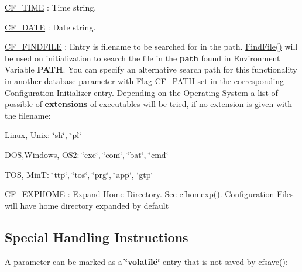 \begin{DoxyItemize}
\item \hyperlink{group__special__options__mask_ga0fde537a92deb77f75b21c9e8d306509}{C\-F\-\_\-\-T\-I\-M\-E} \-: Time string. 
\begin{DoxyItemize}
\item \hyperlink{group__special__options__mask_ga1c5b511a34d2c0db6631539ba81a4386}{C\-F\-\_\-\-D\-A\-T\-E} \-: Date string. 
\end{DoxyItemize}
\end{DoxyItemize}


\begin{DoxyItemize}
\item \hyperlink{group__special__options__mask_ga675b6f8440beecc09fec54d17e9c3ee9}{C\-F\-\_\-\-F\-I\-N\-D\-F\-I\-L\-E} \-: Entry is filename to be searched for in the path.  \hyperlink{group__utilities_ga59fc2b29cf26051e0854b664f5aed15d}{Find\-File()} will be used on initialization to search the file in the {\bfseries path} found in Environment Variable {\bfseries P\-A\-T\-H}. You can specify an alternative search path for this functionality in another database parameter with Flag \hyperlink{group__special__options__mask_gab383c1436888ea6b410141f7c0b1f306}{C\-F\-\_\-\-P\-A\-T\-H} set in the corresponding \hyperlink{config_initializer}{Configuration Initializer} entry. Depending on the Operating System a list of possible of {\bfseries extensions} of executables will be tried, if no extension is given with the filename\-:
\begin{DoxyItemize}
\item Linux, Unix\-: \char`\"{}sh\char`\"{}, \char`\"{}pl\char`\"{}
\item D\-O\-S,Windows, O\-S2\-: \char`\"{}exe\char`\"{}, \char`\"{}com\char`\"{}, \char`\"{}bat\char`\"{}, \char`\"{}cmd\char`\"{}
\item T\-O\-S, Min\-T\-: \char`\"{}ttp\char`\"{}, \char`\"{}tos\char`\"{}, \char`\"{}prg\char`\"{}, \char`\"{}app\char`\"{}, \char`\"{}gtp\char`\"{}
\end{DoxyItemize}
\end{DoxyItemize}


\begin{DoxyItemize}
\item \hyperlink{group__special__options__mask_gaff1b2e25aa9a89a55c1784018e24aa75}{C\-F\-\_\-\-E\-X\-P\-H\-O\-M\-E} \-: Expand Home Directory.  See \hyperlink{group__advanced__features_ga469258ed449ac26d5c82e665db491ff2}{cfhomexp()}. \hyperlink{config_files}{Configuration Files} will have home directory expanded by default
\end{DoxyItemize}\hypertarget{parameter_types_handling_instructions}{}\subsection{Special Handling Instructions}\label{parameter_types_handling_instructions}
A parameter can be marked as a {\bfseries \char`\"{}volatile\char`\"{}} entry that is not saved by \hyperlink{group__setting__saving_gaad7e1267cd904b4480a0eeaeb03b5f75}{cfsave()}\-:


